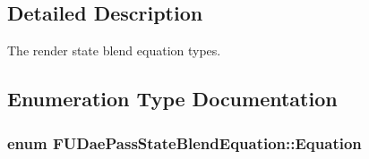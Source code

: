 \subsection{Detailed Description}
The render state blend equation types. 

\subsection{Enumeration Type Documentation}
\hypertarget{namespaceFUDaePassStateBlendEquation_ae93e86bb1bebea11494ca0085a6a6f4d}{
\subsubsection[{Equation}]{\setlength{\rightskip}{0pt plus 5cm}enum {\bf FUDaePassStateBlendEquation::Equation}}}
\label{namespaceFUDaePassStateBlendEquation_ae93e86bb1bebea11494ca0085a6a6f4d}
